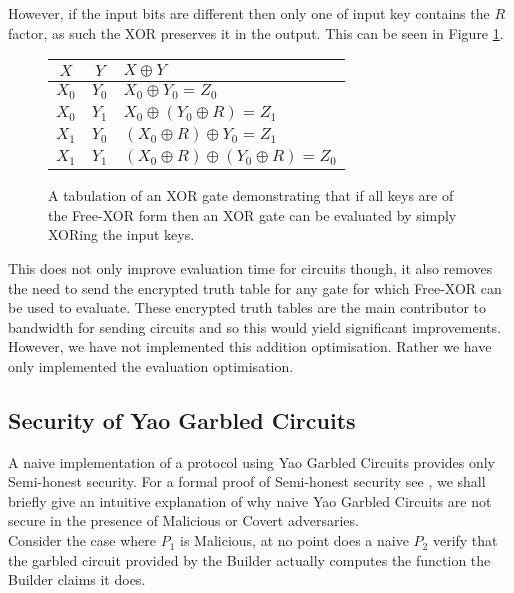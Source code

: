 \documentclass[ %
                    author={Nicholas Tutte},
                supervisor={Prof. Nigel Smart},
                    degree={MEng},
                     title={Secure Two Party Computation},
                  subtitle={A practical comparison of recent protocols},
                      type={Research - GG1K},
                      year={2015} ]{dissertation}
\begin{document}
				However, if the input bits are different then only one of input key contains the $R$ factor, as such the XOR preserves it in the output. This can be seen in Figure \ref{table:FREE_XOR_Demonstration}.\\
% 
				\begin{figure}[!ht]
					\begin{center}
						\begin{tabular}{c c | l }
							$X$ & $Y$ & $X \oplus Y$\\
							\hline
							$X_0$ & $Y_0$ & $X_0 \oplus Y_0 = Z_0$ \\
							$X_0$ & $Y_1$ & $X_0 \oplus (Y_0 \oplus R) = Z_1$ \\
							$X_1$ & $Y_0$ & $(X_0 \oplus R) \oplus Y_0 = Z_1$ \\
							$X_1$ & $Y_1$ & $(X_0 \oplus R) \oplus (Y_0 \oplus R) = Z_0$ \\
						\end{tabular}
					\end{center}
					\caption{A tabulation of an XOR gate demonstrating that if all keys are of the Free-XOR form then an XOR gate can be evaluated by simply XORing the input keys. \label{table:FREE_XOR_Demonstration}}
				\end{figure}

				This does not only improve evaluation time for circuits though, it also removes the need to send the encrypted truth table for any gate for which Free-XOR can be used to evaluate. These encrypted truth tables are the main contributor to bandwidth for sending circuits and so this would yield significant improvements. However, we have not implemented this addition optimisation. Rather we have only implemented the evaluation optimisation.

		\subsection{Security of Yao Garbled Circuits} \label{sub:YaoSecurity}
			A naive implementation of a protocol using Yao Garbled Circuits provides only Semi-honest security. For a formal proof of Semi-honest security see \cite{ProofOfYaoSecurity}, we shall briefly give an intuitive explanation of why naive Yao Garbled Circuits are not secure in the presence of Malicious or Covert adversaries.\\

			Consider the case where $P_1$ is Malicious, at no point does a naive $P_2$ verify that the garbled circuit provided by the Builder actually computes the function the Builder claims it does.\\
\end{document}
